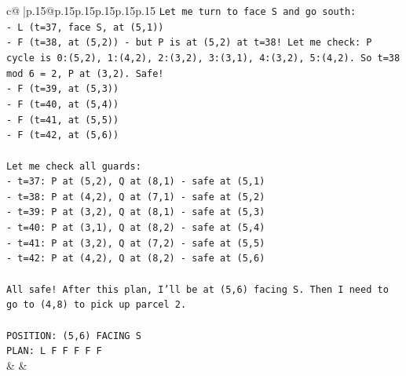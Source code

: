 \documentclass{article}
\begin{document}
{\begin{supertabular}{c@{$\;$}|p{.15\linewidth}@{}p{.15\linewidth}p{.15\linewidth}p{.15\linewidth}p{.15\linewidth}p{.15\linewidth}}
{{{\texttt{Let me turn to face S and go south:} \\
\texttt{{-} L (t=37, face S, at (5,1))} \\
\texttt{{-} F (t=38, at (5,2)) {-} but P is at (5,2) at t=38! Let me check: P cycle is 0:(5,2), 1:(4,2), 2:(3,2), 3:(3,1), 4:(3,2), 5:(4,2). So t=38 mod 6 = 2, P at (3,2). Safe!} \\
\texttt{{-} F (t=39, at (5,3))} \\
\texttt{{-} F (t=40, at (5,4))} \\
\texttt{{-} F (t=41, at (5,5))} \\
\texttt{{-} F (t=42, at (5,6))} \\
\\ 
\texttt{Let me check all guards:} \\
\texttt{{-} t=37: P at (5,2), Q at (8,1) {-} safe at (5,1)} \\
\texttt{{-} t=38: P at (4,2), Q at (7,1) {-} safe at (5,2)} \\
\texttt{{-} t=39: P at (3,2), Q at (8,1) {-} safe at (5,3)} \\
\texttt{{-} t=40: P at (3,1), Q at (8,2) {-} safe at (5,4)} \\
\texttt{{-} t=41: P at (3,2), Q at (7,2) {-} safe at (5,5)} \\
\texttt{{-} t=42: P at (4,2), Q at (8,2) {-} safe at (5,6)} \\
\\ 
\texttt{All safe! After this plan, I'll be at (5,6) facing S. Then I need to go to (4,8) to pick up parcel 2.} \\
\\ 
\texttt{POSITION: (5,6) FACING S} \\
\texttt{PLAN: L F F F F F} \\
            }
        }
    }
    & & \\ \\


\end{supertabular}}
\end{document}
